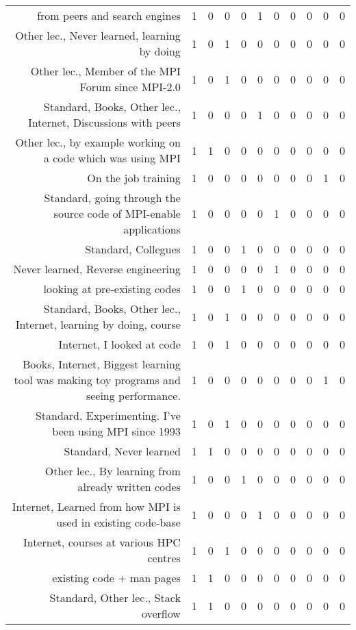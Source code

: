 {\begin{landscape}
\begin{longtable}[htb]{r|c|c|c|c|c|c|c|c|c|c}
{from peers and search engines} & 1 & 0 & 0 & 0 & 1 & 0 & 0 & 0 & 0 & 0 \\%
{Other lec., Never learned, learning by doing} & 1 & 0 & 1 & 0 & 0 & 0 & 0 & 0 & 0 & 0 \\%
{Other lec., Member of the MPI Forum since MPI-2.0} & 1 & 0 & 1 & 0 & 0 & 0 & 0 & 0 & 0 & 0 \\%
{Standard, Books, Other lec., Internet, Discussions with peers} & 1 & 0 & 0 & 0 & 1 & 0 & 0 & 0 & 0 & 0 \\%
{Other lec., by example working on a code which was using MPI} & 1 & 1 & 0 & 0 & 0 & 0 & 0 & 0 & 0 & 0 \\%
{On the job training} & 1 & 0 & 0 & 0 & 0 & 0 & 0 & 0 & 1 & 0 \\%
{Standard, going through the source code of MPI-enable applications} & 1 & 0 & 0 & 0 & 0 & 1 & 0 & 0 & 0 & 0 \\%
{Standard, Collegues} & 1 & 0 & 0 & 1 & 0 & 0 & 0 & 0 & 0 & 0 \\%
{Never learned, Reverse engineering} & 1 & 0 & 0 & 0 & 0 & 1 & 0 & 0 & 0 & 0 \\%
{looking at pre-existing codes} & 1 & 0 & 0 & 1 & 0 & 0 & 0 & 0 & 0 & 0 \\%
{Standard, Books, Other lec., Internet, learning by doing, course} & 1 & 0 & 1 & 0 & 0 & 0 & 0 & 0 & 0 & 0 \\%
{Internet, I looked at code} & 1 & 0 & 1 & 0 & 0 & 0 & 0 & 0 & 0 & 0 \\%
{Books, Internet, Biggest learning tool was making toy programs and seeing performance.} & 1 & 0 & 0 & 0 & 0 & 0 & 0 & 0 & 1 & 0 \\%
{Standard, Experimenting. I've been using MPI since 1993} & 1 & 0 & 1 & 0 & 0 & 0 & 0 & 0 & 0 & 0 \\%
{Standard, Never learned} & 1 & 1 & 0 & 0 & 0 & 0 & 0 & 0 & 0 & 0 \\%
{Other lec., By learning from already written codes} & 1 & 0 & 0 & 1 & 0 & 0 & 0 & 0 & 0 & 0 \\%
{Internet, Learned from how MPI is used in existing code-base} & 1 & 0 & 0 & 0 & 1 & 0 & 0 & 0 & 0 & 0 \\%
{Internet, courses at various HPC centres} & 1 & 0 & 1 & 0 & 0 & 0 & 0 & 0 & 0 & 0 \\%
{existing code + man pages} & 1 & 1 & 0 & 0 & 0 & 0 & 0 & 0 & 0 & 0 \\%
{Standard, Other lec., Stack overflow} & 1 & 1 & 0 & 0 & 0 & 0 & 0 & 0 & 0 & 0 \\%

\end{longtable}
\end{landscape}}
